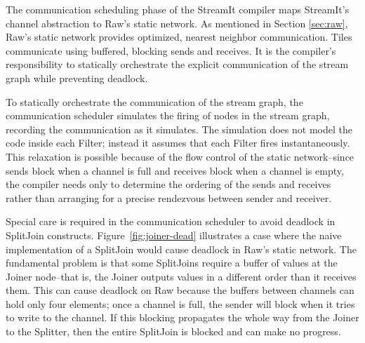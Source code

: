 The communication scheduling phase of the StreamIt compiler maps
StreamIt's channel abstraction to Raw's static network.  As mentioned
in Section \ref{sec:raw}, Raw's static network provides optimized,
nearest neighbor communication.  Tiles communicate using buffered,
blocking sends and receives.  It is the compiler's responsibility to
statically orchestrate the explicit communication of the stream graph
while preventing deadlock.

To statically orchestrate the communication of the stream graph, the
communication scheduler simulates the firing of nodes in the stream
graph, recording the communication as it simulates.  The simulation
does not model the code inside each Filter; instead it assumes that
each Filter fires instantaneously.  This relaxation is possible
because of the flow control of the static network--since sends block
when a channel is full and receives block when a channel is empty, the
compiler needs only to determine the ordering of the sends and
receives rather than arranging for a precise rendezvous between sender
and receiver.

% 

Special care is required in the communication scheduler to avoid
deadlock in SplitJoin constructs.  Figure~\ref{fig:joiner-dead}
illustrates a case where the naive implementation of a SplitJoin would
cause deadlock in Raw's static network.  The fundamental problem is
that some SplitJoins require a buffer of values at the Joiner
node--that is, the Joiner outputs values in a different order than it
receives them.  This can cause deadlock on Raw because the buffers
between channels can hold only four elements; once a channel is full,
the sender will block when it tries to write to the channel.  If this
blocking propagates the whole way from the Joiner to the Splitter,
then the entire SplitJoin is blocked and can make no progress.

